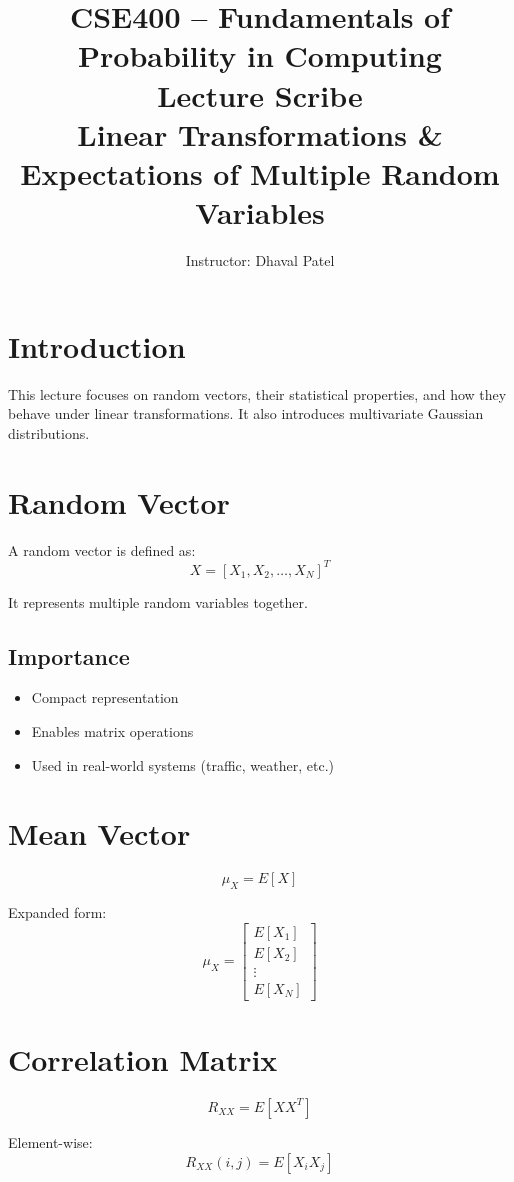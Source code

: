 \documentclass[12pt,a4paper]{article}
\title{CSE400 -- Fundamentals of Probability in Computing\\
Lecture Scribe\\
Linear Transformations \& Expectations of Multiple Random Variables}
\author{Instructor: Dhaval Patel}
\date{}
\begin{document}
\maketitle

\section{Introduction}

This lecture focuses on random vectors, their statistical properties, and how they behave under linear transformations. It also introduces multivariate Gaussian distributions.

\section{Random Vector}

A random vector is defined as:
\[
X = [X_1, X_2, \dots, X_N]^T
\]

It represents multiple random variables together.

\subsection{Importance}
\begin{itemize}
\item Compact representation
\item Enables matrix operations
\item Used in real-world systems (traffic, weather, etc.)
\end{itemize}

\section{Mean Vector}

\[
\mu_X = E[X]
\]

Expanded form:
\[
\mu_X =
\begin{bmatrix}
E[X_1] \\
E[X_2] \\
\vdots \\
E[X_N]
\end{bmatrix}
\]

\section{Correlation Matrix}

\[
R_{XX} = E[XX^T]
\]

Element-wise:
\[
R_{XX}(i,j) = E[X_i X_j]
\]
\end{document}
